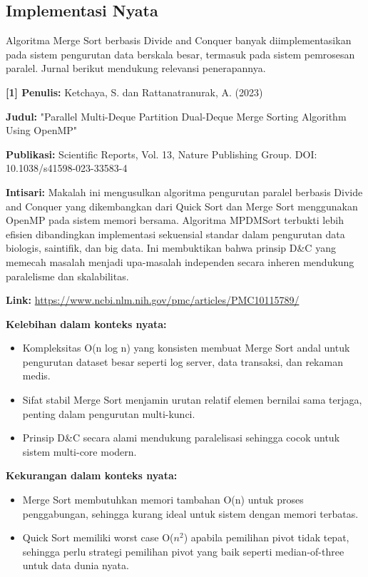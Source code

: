 \subsection{Implementasi Nyata}
Algoritma Merge Sort berbasis Divide and Conquer banyak diimplementasikan pada sistem pengurutan data berskala besar, termasuk pada sistem pemrosesan paralel. Jurnal berikut mendukung relevansi penerapannya.

\vspace{1em}
\textbf{[1] Penulis:} Ketchaya, S. dan Rattanatranurak, A. (2023)

\textbf{Judul:} "Parallel Multi-Deque Partition Dual-Deque Merge Sorting Algorithm Using OpenMP"

\textbf{Publikasi:} Scientific Reports, Vol. 13, Nature Publishing Group. DOI: 10.1038/s41598-023-33583-4

\textbf{Intisari:} Makalah ini mengusulkan algoritma pengurutan paralel berbasis Divide and Conquer yang dikembangkan dari Quick Sort dan Merge Sort menggunakan OpenMP pada sistem memori bersama. Algoritma MPDMSort terbukti lebih efisien dibandingkan implementasi sekuensial standar dalam pengurutan data biologis, saintifik, dan big data. Ini membuktikan bahwa prinsip D\&C yang memecah masalah menjadi upa-masalah independen secara inheren mendukung paralelisme dan skalabilitas.

\textbf{Link:} \url{https://www.ncbi.nlm.nih.gov/pmc/articles/PMC10115789/}

\vspace{1em}
\textbf{Kelebihan dalam konteks nyata:}
\begin{itemize}
    \item Kompleksitas O(n log n) yang konsisten membuat Merge Sort andal untuk pengurutan dataset besar seperti log server, data transaksi, dan rekaman medis.
    \item Sifat stabil Merge Sort menjamin urutan relatif elemen bernilai sama terjaga, penting dalam pengurutan multi-kunci.
    \item Prinsip D\&C secara alami mendukung paralelisasi sehingga cocok untuk sistem multi-core modern.
\end{itemize}

\textbf{Kekurangan dalam konteks nyata:}
\begin{itemize}
    \item Merge Sort membutuhkan memori tambahan O(n) untuk proses penggabungan, sehingga kurang ideal untuk sistem dengan memori terbatas.
    \item Quick Sort memiliki worst case O($n^2$) apabila pemilihan pivot tidak tepat, sehingga perlu strategi pemilihan pivot yang baik seperti median-of-three untuk data dunia nyata.
\end{itemize}